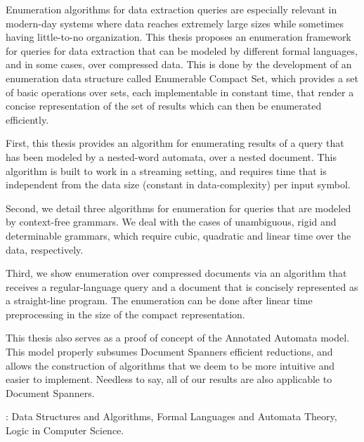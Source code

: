 \noindent Enumeration algorithms for data extraction queries are especially relevant in modern-day systems where data reaches extremely large sizes while sometimes having little-to-no organization.
This thesis proposes an enumeration framework for queries for data extraction that can be modeled by different formal languages, and in some cases, over compressed data. This is done by the development of an enumeration data structure called Enumerable Compact Set, which provides a set of basic operations over sets, each implementable in constant time, that render a concise representation of the set of results which can then be enumerated efficiently.

\noindent First, this thesis provides an algorithm for enumerating results of a query that has been modeled by a nested-word automata, over a nested document. This algorithm is built to work in a streaming setting, and requires time that is independent from the data size (constant in data-complexity) per input symbol.

\noindent Second, we detail three algorithms for enumeration for queries that are modeled by context-free grammars. We deal with the cases of unambiguous, rigid and determinable grammars, which require cubic, quadratic and linear time over the data, respectively.

\noindent Third, we show enumeration over compressed documents via an algorithm that receives a regular-language query and a document that is concisely represented as a straight-line program. The enumeration can be done after linear time preprocessing in the size of the compact representation.

\noindent This thesis also serves as a proof of concept of the Annotated Automata model. This model properly subsumes Document Spanners efficient reductions, and allows the construction of algorithms that we deem to be more intuitive and easier to implement. Needless to say, all of our results are also applicable to Document Spanners.

\vfill
{}: Data Structures and Algorithms, Formal Languages and Automata Theory, Logic in Computer Science.
